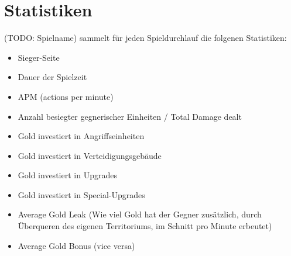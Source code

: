 \section{Statistiken}

%
%

(TODO: Spielname) sammelt für jeden Spieldurchlauf die folgenen Statistiken:
\begin{itemize}
	\item Sieger-Seite
	\item Dauer der Spielzeit
	\item APM (actions per minute)
	\item Anzahl besiegter gegnerischer Einheiten / Total Damage dealt
	\item Gold investiert in Angriffseinheiten
	\item Gold investiert in Verteidigungsgebäude
	\item Gold investiert in Upgrades
	\item Gold investiert in Special-Upgrades
	\item Average Gold Leak (Wie viel Gold hat der Gegner zusätzlich, durch Überqueren des eigenen Territoriums, im Schnitt pro Minute erbeutet)
	\item Average Gold Bonus (vice versa)
\end{itemize}

